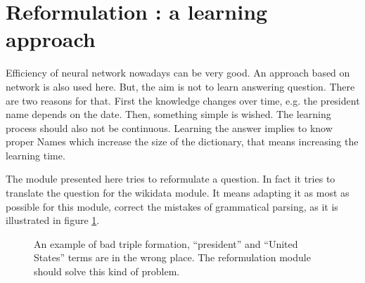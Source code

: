 \section{Reformulation : a learning approach }
\label{mlreformulation}

Efficiency of neural network nowadays can be very good. An approach based on network is also used here. But, the aim is not to learn answering question. There are two reasons for that. First the knowledge changes over time, e.g. the president name depends on the date. Then, something simple is wished. The learning process should also not be continuous. Learning the answer implies to know proper Names which increase the size of the dictionary, that means increasing the learning time. 

The module presented here tries to reformulate a question. In fact it tries to translate the question for the wikidata module. It means adapting it as most as possible for this module, correct the mistakes of grammatical parsing, as it is illustrated in figure \ref{figexmlrefref}.

\begin{figure}
    \centering
 \caption{An example of bad triple formation, ``president'' and ``United States'' terms are in the wrong place. The reformulation module should solve this kind of problem.}
\label{figexmlrefref}
\end{figure}

